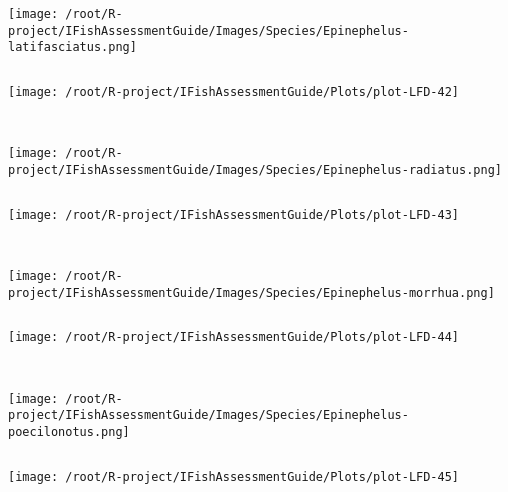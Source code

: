 \documentclass{report}\usepackage[]{graphicx}\usepackage[]{color}
\makeatletter
\def\maxwidth{ %
  \ifdim\Gin@nat@width>\linewidth
    \linewidth
  \else
    \Gin@nat@width
  \fi
}
\newenvironment{kframe}{%
 \def\at@end@of@kframe{}%
 \ifinner\ifhmode%
  \def\at@end@of@kframe{\end{minipage}}%
  \begin{minipage}{\columnwidth}%
 \fi\fi%
 \def\FrameCommand##1{\hskip\@totalleftmargin \hskip-\fboxsep
 \colorbox{shadecolor}{##1}\hskip-\fboxsep
     \hskip-\linewidth \hskip-\@totalleftmargin \hskip\columnwidth}%
 \MakeFramed {\advance\hsize-\width
   \@totalleftmargin\z@ \linewidth\hsize
   \@setminipage}}%
 {\par\unskip\endMakeFramed%
 \at@end@of@kframe}
\newenvironment{knitrout}{}{} %
\makeatother
\begin{document}
\begin{knitrout}
\begin{kframe}
\begin{verbatim}
\end{verbatim}
\end{kframe}
\texttt{[image: /root/R-project/IFishAssessmentGuide/Images/Species/Epinephelus-latifasciatus.png]}
\begin{kframe}\begin{verbatim}
\end{verbatim}
\end{kframe}
\texttt{[image: /root/R-project/IFishAssessmentGuide/Plots/plot-LFD-42]} 
\begin{kframe}\begin{verbatim}
 
\end{verbatim}
\end{kframe}
\texttt{[image: /root/R-project/IFishAssessmentGuide/Images/Species/Epinephelus-radiatus.png]}
\begin{kframe}\begin{verbatim}
\end{verbatim}
\end{kframe}
\texttt{[image: /root/R-project/IFishAssessmentGuide/Plots/plot-LFD-43]} 
\begin{kframe}\begin{verbatim}
 
\end{verbatim}
\end{kframe}
\texttt{[image: /root/R-project/IFishAssessmentGuide/Images/Species/Epinephelus-morrhua.png]}
\begin{kframe}\begin{verbatim}
\end{verbatim}
\end{kframe}
\texttt{[image: /root/R-project/IFishAssessmentGuide/Plots/plot-LFD-44]} 
\begin{kframe}\begin{verbatim}
 
\end{verbatim}
\end{kframe}
\texttt{[image: /root/R-project/IFishAssessmentGuide/Images/Species/Epinephelus-poecilonotus.png]}
\begin{kframe}\begin{verbatim}
\end{verbatim}
\end{kframe}
\texttt{[image: /root/R-project/IFishAssessmentGuide/Plots/plot-LFD-45]} 
\begin{kframe}\begin{verbatim}
 

\end{verbatim}
\end{kframe}
\end{knitrout}
\end{document}
